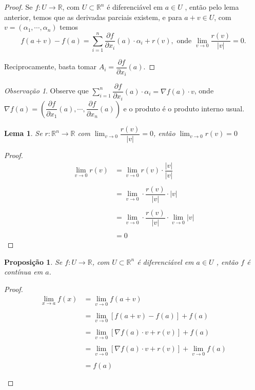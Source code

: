 \documentclass{article}
\newtheorem{prop}{Proposição}[section]
\theoremstyle{theorem}
\theoremstyle{lemma}
\newtheorem{lema}{Lema}
\theoremstyle{definition}
\theoremstyle{remark}
\newtheorem{obs}{Observação}[section]
\begin{document}
   \begin{proof}
	   Se \(f:U\to \mathbb{R}\), com \( U \subset \mathbb{R}^n \) é diferenciável em \( a\in U \) , então pelo lema anterior, temos que as derivadas parciais existem, e para \(a+v\in U\), com \( v = (\alpha_1, \cdots , \alpha_n ) \)  temos  \[ f(a+v) - f(a) = \sum_{i=1}^n \dfrac{\partial f}{\partial x_i}(a) \cdot \alpha_i  + r(v), \text{ onde } \lim_{v \to 0} \dfrac{r(v)}{|v|} = 0.\]

	   Reciprocamente, basta tomar \( A_i = \dfrac{\partial f}{\partial x_i}(a) \).
   \end{proof}
   \begin{obs}
	   Observe que \( \displaystyle\sum_{i=1}^n \dfrac{\partial f}{\partial x_i}(a) \cdot \alpha_i = \nabla f(a) \cdot v \), onde \(\nabla f(a) = \left( \dfrac{\partial f}{\partial x_1}(a) , \cdots, \dfrac{\partial f}{\partial x_n} (a) \right)\) e o produto é o produto interno usual.
   \end{obs}
   \begin{lema}
	   Se \( r: \mathbb{R}^n \to \mathbb{R}\) com \( \displaystyle\lim_{v \to 0} \dfrac{r(v)}{|v|} = 0 \), então \( \displaystyle\lim_{v \to 0} r(v) = 0 \)
   \end{lema}
   \begin{proof}
	   \begin{align*}
		   \lim_{v \to 0} r(v) &= \lim_{v \to 0} r(v)\cdot \dfrac{|v|}{|v|}  \\~\\
		   &= \lim_{v \to 0} \cdot \dfrac{r(v)}{|v|} \cdot |v|  \\~\\
		   &= \lim_{v \to 0} \cdot \dfrac{r(v)}{|v|} \cdot \lim_{v\to 0} |v|  \\~\\
		   &=0
	   \end{align*}
   \end{proof}
   \begin{prop}
	   Se \(f:U\to \mathbb{R}\), com \( U \subset \mathbb{R}^n \) é diferenciável em \( a\in U \) , então \(f\) é contínua em \(a\).
   \end{prop}
   \begin{proof}
	   \begin{align*}
		   \lim_{x \to a} f(x) &= \lim_{v \to 0} f(a+v) \\~\\ 	 %
		   &= \lim_{v \to 0} \left[f(a+v) - f(a) \right]+ f(a) \\~\\
		   &= \lim_{v \to 0} \left[ \nabla f(a) \cdot v + r(v)  \right]+ f(a) \\~\\
		   &= \lim_{v \to 0} \left[ \nabla f(a) \cdot v + r(v)  \right]+ \lim_{v\to 0} f(a) \\~\\
		   &= f(a) \\~\\
	   \end{align*}
   \end{proof}
\end{document}
